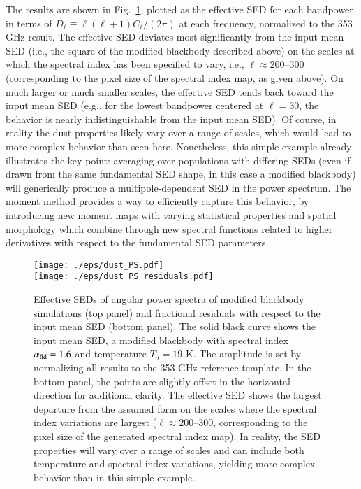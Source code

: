 \documentclass[usenatbib]{mn2e}
\begin{document}
The results are shown in Fig.~\ref{fig:dust_PS}, plotted as the effective SED for each bandpower in terms of $D_{\ell} \equiv \ell(\ell+1) C_{\ell}/(2\pi)$ at each frequency, normalized to the 353 GHz result.  The effective SED deviates most significantly from the input mean SED (i.e., the square of the modified blackbody described above) on the scales at which the spectral index has been specified to vary, i.e., $\ell \approx 200$--$300$ (corresponding to the pixel size of the spectral index map, as given above).  On much larger or much smaller scales, the effective SED tends back toward the input mean SED (e.g., for the lowest bandpower centered at $\ell = 30$, the behavior is nearly indistinguishable from the input mean SED). Of course, in reality the dust properties likely vary over a range of scales, which would lead to more complex behavior than seen here.  Nonetheless, this simple example already illustrates the key point: averaging over populations with differing SEDs (even if drawn from the same fundamental SED shape, in this case a modified blackbody) will generically produce a multipole-dependent SED in the power spectrum.  The moment method provides a way to efficiently capture this behavior, by introducing new moment maps with varying statistical properties and spatial morphology which combine through new spectral functions related to higher derivatives with respect to the fundamental SED parameters.

\begin{figure}
\centering 
\texttt{[image: ./eps/dust\_PS.pdf]}
\\[1mm]
\texttt{[image: ./eps/dust\_PS\_residuals.pdf]}
\caption{Effective SEDs of angular power spectra of modified blackbody simulations (top panel) and fractional residuals with respect to the input mean SED (bottom panel).  The solid black curve shows the input mean SED, a modified blackbody with spectral index $\alpha_{\rm fid} = 1.6$ and temperature $T_d = 19$ K.  The amplitude is set by normalizing all results to the 353 GHz reference template.  In the bottom panel, the points are slightly offset in the horizontal direction for additional clarity.  The effective SED shows the largest departure from the assumed form on the scales where the spectral index variations are largest ($\ell \approx 200$--$300$, corresponding to the pixel size of the generated spectral index map).  In reality, the SED properties will vary over a range of scales and can include both temperature and spectral index variations, yielding more complex behavior than in this simple example.}
\label{fig:dust_PS}
\end{figure}
\end{document}
